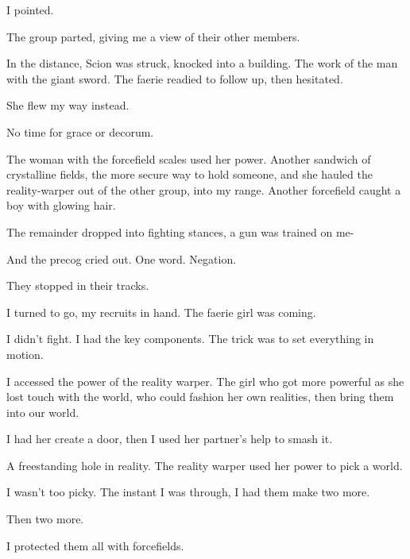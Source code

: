 I pointed.



The group parted, giving me a view of their other members.



In the distance, Scion was struck, knocked into a building.  The work of the man with the giant sword.  The faerie readied to follow up, then hesitated.



She flew my way instead.



No time for grace or decorum.



The woman with the forcefield scales used her power.  Another sandwich of crystalline fields, the more secure way to hold someone, and she hauled the reality-warper out of the other group, into my range.  Another forcefield caught a boy with glowing hair.



The remainder dropped into fighting stances, a gun was trained on me-



And the precog cried out.  One word.  Negation.



They stopped in their tracks.



I turned to go, my recruits in hand.  The faerie girl was coming.



I didn't fight.  I had the key components.  The trick was to set everything in motion.



I accessed the power of the reality warper.  The girl who got more powerful as she lost touch with the world, who could fashion her own realities, then bring them into our world.



I had her create a door, then I used her partner's help to smash it.



A freestanding hole in reality.  The reality warper used her power to pick a world.



I wasn't too picky.  The instant I was through, I had them make two more.



Then two more.



I protected them all with forcefields.



